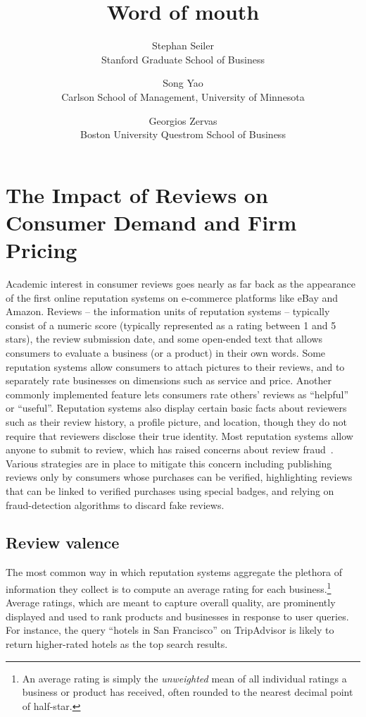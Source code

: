 \documentclass[letter,12pt]{article}
\begin{document}
\title{Word of mouth}
\author{
	Stephan Seiler \\
	Stanford Graduate School of Business
	\and
	Song Yao \\
	Carlson School of Management, University of Minnesota
	\and
	Georgios Zervas \\
	Boston University Questrom School of Business
}
\maketitle

\doublespacing

\section{The Impact of Reviews on Consumer Demand and Firm Pricing}

Academic interest in consumer reviews goes nearly as far back as the
appearance of the first online reputation systems on e-commerce platforms like
eBay and Amazon. Reviews -- the information units of reputation systems --
typically consist of a numeric score (typically represented as a rating
between 1 and 5 stars), the review submission date, and some open-ended text
that allows consumers to evaluate a business (or a product) in their own
words. Some reputation systems allow consumers to attach pictures to their
reviews, and to separately rate businesses on dimensions such as service and
price. Another commonly implemented feature lets consumers rate others'
reviews as ``helpful'' or ``useful''. Reputation systems also display certain
basic facts about reviewers such as their review history, a profile picture,
and location, though they do not require that reviewers disclose their true
identity. Most reputation systems allow anyone to submit to review, which has
raised concerns about review
fraud~\citep{mayzlin2014promotional,luca2016fake}. Various strategies are in
place to mitigate this concern including publishing reviews only by consumers
whose purchases can be verified, highlighting reviews that can be linked to
verified purchases using special badges, and relying on fraud-detection
algorithms to discard fake reviews.

\subsection{Review valence}

The most common way in which reputation systems aggregate the plethora of
information they collect is to compute an average rating for each
business.\footnote{An average rating is simply the \emph{unweighted} mean of
all individual ratings a business or product has received, often rounded to
the nearest decimal point of half-star.} Average ratings, which are meant to
capture overall quality, are prominently displayed and used to rank products
and businesses in response to user queries. For instance, the query ``hotels
in San Francisco'' on TripAdvisor is likely to return higher-rated hotels as
the top search results.
\end{document}
